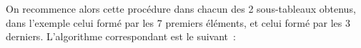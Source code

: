 		\begin{center}
			\tablefirsthead{}
			\tablehead{}
			\tabletail{}
			\tablelasttail{}
			\begin{supertabular}{|m{1.171cm}|m{1.206cm}|m{1.206cm}|m{1.206cm}|m{1.206cm}|m{1.206cm}|m{1.206cm}|m{1.206cm}|m{1.206cm}|m{1.232cm}|}
			\hline
			 &
			 &
			 &
			 &
			 &
			 &
			 &
			 &
			 &
			\centering{}\\\hline
			\end{supertabular}
		\end{center}

		\begin{center}
			\tablefirsthead{}
			\tablehead{}
			\tabletail{}
			\tablelasttail{}
			\begin{supertabular}{|m{1.171cm}|m{1.206cm}|m{1.206cm}|m{1.206cm}|m{1.206cm}|m{1.206cm}|m{1.206cm}|m{1.206cm}|m{1.206cm}|m{1.232cm}|}
			\hline
			 &
			 &
			 &
			 &
			 &
			 &
			 &
			 &
			 &
			\centering{}\\\hline
			\end{supertabular}
		\end{center}

		On recommence alors cette procédure dans chacun des 2 sous-tableaux 
		obtenus, dans l'exemple celui formé par les 7 premiers éléments, 
		et celui formé par les 3 derniers. L'algorithme correspondant est 
		le suivant~:


